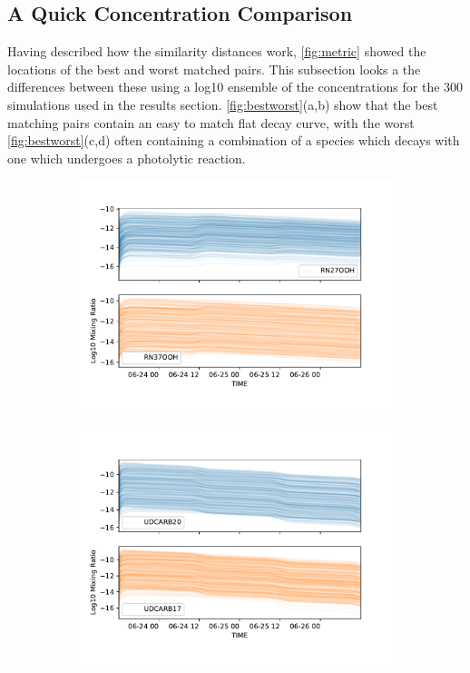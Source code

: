   \subsection{A Quick Concentration Comparison}
  Having described how the similarity distances work, \autoref{fig:metric} showed the locations of the best and worst matched pairs. This subsection looks a the differences between these using a log10 ensemble of the concentrations for the 300 simulations used in the results section. \autoref{fig:bestworst}(a,b) show that the best matching pairs contain an easy to match flat decay curve, with the worst \autoref{fig:bestworst}(c,d) often containing a combination of a species which decays with one which undergoes a photolytic reaction.


  \begin{figure}[H]
  \begin{subfigure}[t]{.5\textwidth}
    \centering
    \includegraphics[width=\textwidth]{ensemble/RN27OOH-RN37OOH.pdf}
    \caption{}
  \end{subfigure}%
  \begin{subfigure}[t]{.5\textwidth}
    \centering
    \includegraphics[width=\textwidth]{ensemble/UDCARB20-UDCARB17.pdf}
    \caption{}
  \end{subfigure}%


\end{figure}
